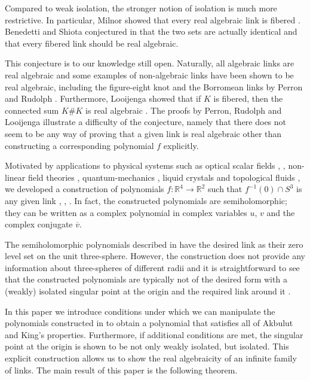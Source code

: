 \documentclass[notitlepage,12pt]{revtex4-1}
\begin{document}
Compared to weak isolation, the stronger notion of isolation is much more restrictive. In particular, Milnor showed that every real algebraic link is fibered \cite{milnor:1968singular}. Benedetti and Shiota conjectured in \cite{benedetti1998:real} that the two sets are actually identical and that every fibered link should be real algebraic. 

This conjecture is to our knowledge still open. 
Naturally, all algebraic links are real algebraic and some examples of non-algebraic links have been shown to be real algebraic, including the figure-eight knot and the Borromean links by Perron \cite{perron:1982noeud} and Rudolph \cite{rudolph:1987isolated}. Furthermore, Looijenga showed that if $K$ is fibered, then the connected sum $K\# K$ is real algebraic \cite{looijenga:1971note}. 
The proofs by Perron, Rudolph and Looijenga illustrate a difficulty of the conjecture, namely that there does not seem to be any way of proving that a given link is real algebraic other than constructing a corresponding polynomial $f$ explicitly. 

Motivated by applications to physical systems such as optical scalar fields \cite{bd:2001knotted}, \cite{dkjop:2010isolated}, non-linear field theories \cite{sutcliffe:2007knots}, quantum-mechanics \cite{berry:2001hydrogen}, liquid crystals \cite{ma:2014knotted} and topological fluids \cite{moffatt:1969degree}, we developed a construction of polynomials $f:\mathbb{R}^4\to\mathbb{R}^2$ such that $f^{-1}(0)\cap S^{3}$ is any given link \cite{bode:2016lemniscate}, \cite{bode:2016polynomial}, \cite{bode:201652}. In fact, the constructed polynomials are semiholomorphic; they can be written as a complex polynomial in complex variables $u$, $v$ and the complex conjugate $\overline{v}$.

The semiholomorphic polynomials described in \cite{bode:2016polynomial} have the desired link as their zero level set on the unit three-sphere. However, the construction does not provide any information about three-spheres of different radii and it is straightforward to see that the constructed polynomials are typically not of the desired form with a (weakly) isolated singular point at the origin and the required link around it \cite{bode:201652}.

In this paper we introduce conditions under which we can manipulate the polynomials constructed in \cite{bode:2016polynomial} to obtain a polynomial that satisfies all of Akbulut and King's properties.
Furthermore, if additional conditions are met, the singular point at the origin is shown to be not only weakly isolated, but isolated. This explicit construction allows us to show the real algebraicity of an infinite family of links. The main result of this paper is the following theorem.
\end{document}
